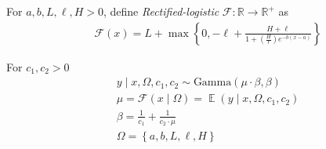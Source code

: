 \documentclass[a4paper,12pt]{article}
\DeclareMathOperator{\E}{\mathbb{E}}
\begin{document}
    For $a, b, L, \ell, H > 0$, define \textit{Rectified-logistic} $\mathcal{F}: \mathbb{R} \to \mathbb{R}^{+}$ as
    \begin{align*}
        &\mathcal{F}\left(x\right) = L + \max\left\{0, -\ell + \frac{H + \ell}{1 + \left(\frac{H}{\ell}\right)e^{-b\left(x-a\right)}} \right\}
    \end{align*}


For $c_1, c_2 > 0$
    \begin{align*}
        &y \mid x, \Omega, c_1, c_2 \sim \text{Gamma}\left(\mu\cdot\beta, \beta\right) \tag{4.2.2}\\
        &\mu = \mathcal{F}\left(x \mid \Omega\right) = \E\left(y \mid x, \Omega, c_1, c_2\right) \tag{4.2.3}\\
        &\beta = \frac{1}{c_1} + \frac{1}{c_2\cdot\mu} \tag{4.2.2}\\
        &{\Omega} = \left\{a, b, L, \ell, H\right\} \tag{4.2.4}\\
    \end{align*}
\end{document}
